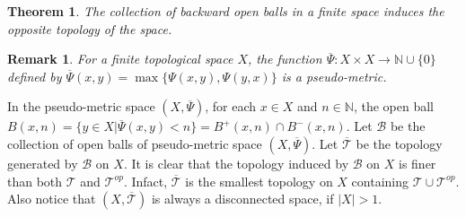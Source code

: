 \documentclass[12pt]{amsart}
\newtheorem{theorem}[definition]{Theorem}
\newtheorem{remark}[definition]{Remark}
\begin{document}
\begin{theorem}
	The collection 
	of backward open balls in a finite space induces the opposite topology of the space.
\end{theorem}

\begin{remark}\label{3.3.}{\normalfont
	For a finite topological space $X$, the function $\overline{\Psi}:X\times X\longrightarrow \mathbb{N}\cup\{0\}$ defined by $\overline{\Psi}(x,y)=\max\{\Psi(x,y),\Psi(y,x)\}$ is a pseudo-metric.}
	\end{remark}
	
	In the pseudo-metric space  $(X,\overline{\Psi})$, for each $ x\in X$ and $n\in\mathbb{N}$, the open ball $ B(x,n)=\{y\in X|\overline{\Psi}(x,y)<n\}=B^+(x,n)\cap B^-(x,n)$. Let $\mathcal{B}$ be the collection of open balls of pseudo-metric space $(X,\overline{\Psi})$. Let $\overline{\mathcal{T}}$ be the topology generated by $\mathcal{B}$ on $X$. %
	It is clear that the topology induced by $\mathcal{B}$ on $X$ is finer than both $\mathcal{T}$ and $\mathcal{T}^{op}$. Infact, $\overline{\mathcal{T}}$ is the smallest topology on $X$ containing $\mathcal{T}\cup \mathcal{T}^{op}$. Also notice that $(X,\overline{\mathcal{T}})$ is always a disconnected space, if $|X|>1$. \par 
	
\end{document}
